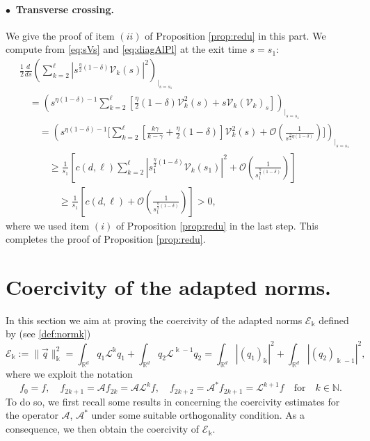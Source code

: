 \documentclass[11pt]{aims}
\theoremstyle{definition}
\numberwithin{equation}{section}
\begin{document}
\paragraph{$\bullet \,$ Transverse crossing.} We give the proof of item $(ii)$ of Proposition \ref{prop:redu} in this part. We compute from \eqref{eq:sVs} and \eqref{eq:diagAlPl} at the exit time $s = s_1$:
\begin{align*}
&\frac{1}{2}\frac{d}{ds}\left(\sum_{k = 2}^\ell|s^{\frac{\eta}{2}(1 - \delta)}{\mathcal{V}}_k(s)|^2 \right)_{\big|_{s= s_1}} \\
&\quad = \left(s^{\eta(1 - \delta) - 1} \sum_{k = 2}^\ell \left[\frac{\eta}{2}(1 - \delta){\mathcal{V}}_k^2(s) + s{\mathcal{V}}_k({\mathcal{V}}_k)_s \right]\right)_{\big|_{s= s_1}}\\
&\qquad = \left(s^{\eta(1 - \delta) - 1} \Bigg[\sum_{k = 2}^\ell \left[\frac{k\gamma}{k - \gamma} + \frac{\eta}{2}(1 - \delta)\right]{\mathcal{V}}_k^2(s) + {\mathcal{O}}\left(\frac{1}{s^{\frac{3}{2}\eta(1 - \delta)}}\right)\Bigg] \right)_{\big|_{s= s_1}}\\
&\quad \qquad \geq \frac{1}{s_1}\left[c(d,\ell) \sum_{k = 2}^\ell |s_1^{\frac{\eta}{2}(1 - \delta)}{\mathcal{V}}_k(s_1)|^2 +  {\mathcal{O}}\left(\frac{1}{s_1^{\frac{\eta}{2}(1 - \delta)}}\right)\right]\\
& \qquad \qquad \geq \frac{1}{s_1}\left[c(d,\ell) +  {\mathcal{O}}\left(\frac{1}{s_1^{\frac{\eta}{2}(1 - \delta)}}\right)\right] > 0,
\end{align*}
where we used item $(i)$ of Proposition \ref{prop:redu} in the last step. This completes the proof of Proposition \ref{prop:redu}.

\appendix

\section{Coercivity of the adapted norms.}
In this section we aim at proving the coercivity of the adapted norms ${\mathscr{E}}_\Bbbk$ defined by (see \eqref{def:normk})
$${\mathscr{E}}_{\Bbbk}:= \|\vec q\|^2_{\Bbbk} = \int_{{\mathbb{R}}^d} q_1{\mathscr{L}}^{\Bbbk}q_1 + \int_{{\mathbb{R}}^d} q_2{\mathscr{L}}^{\Bbbk - 1}q_2 = \int_{{\mathbb{R}}^d}|(q_1)_{\Bbbk}|^2 + \int_{{\mathbb{R}}^d}|(q_2)_{\Bbbk - 1}|^2,$$
where we exploit the notation 
$$f_0 = f, \quad f_{2k + 1} = {\mathscr{A}} f_{2k} = {\mathscr{A}} {\mathscr{L}}^k f, \quad f_{2k+2} = {\mathscr{A}}^*f_{2k + 1} = {\mathscr{L}}^{k + 1}f \quad \text{for} \quad k \in \mathbb{N}.$$
To do so, we first recall some results in \cite{IGN16}
concerning  the coercivity estimates for the operator ${\mathscr{A}}$, ${\mathscr{A}}^*$ under some suitable orthogonality condition. As a consequence, we then obtain the coercivity of ${\mathscr{E}}_\Bbbk$.
\end{document}
